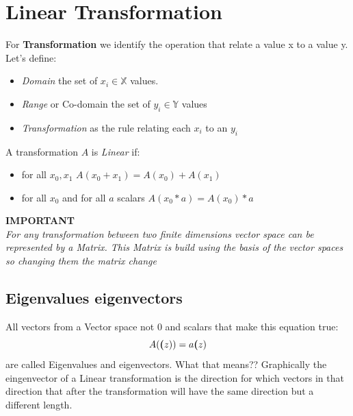 \documentclass[12pt,a4paper,twoside,openright]{scrbook}
\begin{document}
 \section{Linear Transformation}
 For \textbf{Transformation} we identify the operation that relate a value x to a value y. Let's define:
 \begin{itemize}
 \item \textit{Domain} the set of $x_i \in \mathbb{X}$ values.
 \item \textit{Range} or Co-domain the set of $y_i \in \mathbb{Y}$ values
 \item \textit{Transformation} as the rule relating each $x_i$ to an $y_i$ 
 \end{itemize}
 
 A transformation $A$ is \textit{Linear} if:
 \begin{itemize}
 \item for all $x_0, x_1$ $A(x_0 + x_1) = A(x_0) + A(x_1)$
 \item for all $x_0$ and for all $a$ scalars $A(x_0*a) = A(x_0) * a$   
 \end{itemize}
 
 \textbf{IMPORTANT}\\
 \emph{For any transformation between two finite dimensions vector space can be represented by a Matrix. This Matrix is build using the basis of the vector spaces so changing them the matrix change}
 
 \subsection{Eigenvalues eigenvectors}
 All vectors from a Vector space not $0$ and scalars that make this equation true:
 \begin{equation}
 A(\textbf(z)) = a\textbf(z)
\end{equation}  
are called Eigenvalues and eigenvectors. 
What that means?? Graphically the eingenvector of a Linear transformation is the direction for which vectors in that direction that after the transformation will have the same direction but a different length.
\end{document}
